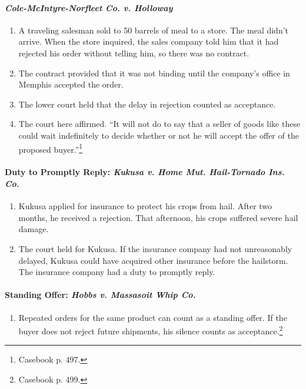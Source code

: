 \paragraph{\emph{Cole-McIntyre-Norfleet Co. v. Holloway}}

\begin{enumerate}
    \item A traveling salesman sold to 50 barrels of meal to a store. The meal 
    didn't arrive. When the store inquired, the sales company told him that it 
    had rejected his order without telling him, so there was no contract.
    \item The contract provided that it was not binding until the company's 
    office in Memphis accepted the order.
    \item The lower court held that the delay in rejection counted as 
    acceptance.
    \item The court here affirmed. ``It will not do to say that a seller of 
    goods like these could wait indefinitely to decide whether or not he will 
    accept the offer of the proposed buyer.''\footnote{Casebook p. 497.}
\end{enumerate}

\paragraph{Duty to Promptly Reply: \emph{Kukusa v. Home Mut. Hail-Tornado Ins. 
Co.}}

\begin{enumerate}
    \item Kukusa applied for insurance to protect his crops from hail. After 
    two months, he received a rejection. That afternoon, his crops suffered 
    severe hail damage.
    \item The court held for Kukusa. If the insurance company had not 
    unreasonably delayed, Kukusa could have acquired other insurance before 
    the hailstorm. The insurance company had a duty to promptly reply.
\end{enumerate}

\paragraph{Standing Offer: \emph{Hobbs v. Massasoit Whip Co.}}

\begin{enumerate}
    \item Repeated orders for the same product can count as a standing offer. 
    If the buyer does not reject future shipments, his silence counts as 
    acceptance.\footnote{Casebook p. 499.}
\end{enumerate}

